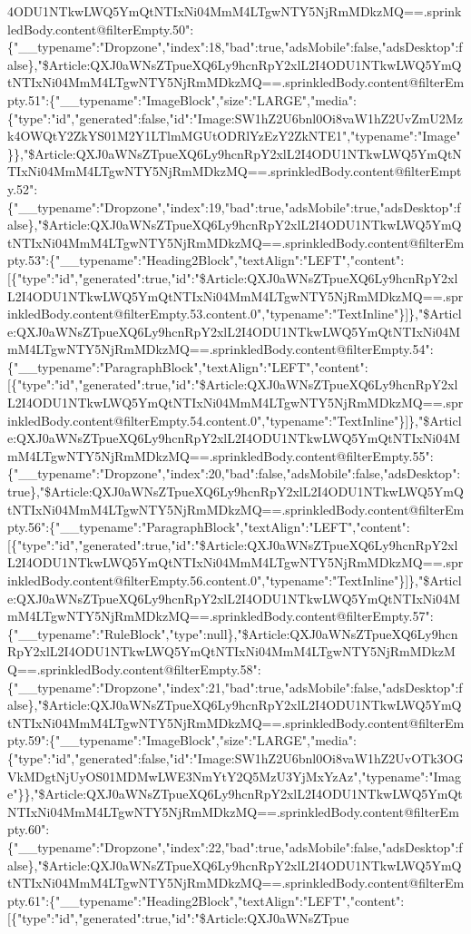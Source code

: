 4ODU1NTkwLWQ5YmQtNTIxNi04MmM4LTgwNTY5NjRmMDkzMQ==.sprinkledBody.content@filterEmpty.50":\{"\_\_typename":"Dropzone","index":18,"bad":true,"adsMobile":false,"adsDesktop":false\},"\$Article:QXJ0aWNsZTpueXQ6Ly9hcnRpY2xlL2I4ODU1NTkwLWQ5YmQtNTIxNi04MmM4LTgwNTY5NjRmMDkzMQ==.sprinkledBody.content@filterEmpty.51":\{"\_\_typename":"ImageBlock","size":"LARGE","media":\{"type":"id","generated":false,"id":"Image:SW1hZ2U6bnl0Oi8vaW1hZ2UvZmU2Mzk4OWQtY2ZkYS01M2Y1LTlmMGUtODRlYzEzY2ZkNTE1","typename":"Image"\}\},"\$Article:QXJ0aWNsZTpueXQ6Ly9hcnRpY2xlL2I4ODU1NTkwLWQ5YmQtNTIxNi04MmM4LTgwNTY5NjRmMDkzMQ==.sprinkledBody.content@filterEmpty.52":\{"\_\_typename":"Dropzone","index":19,"bad":true,"adsMobile":true,"adsDesktop":false\},"\$Article:QXJ0aWNsZTpueXQ6Ly9hcnRpY2xlL2I4ODU1NTkwLWQ5YmQtNTIxNi04MmM4LTgwNTY5NjRmMDkzMQ==.sprinkledBody.content@filterEmpty.53":\{"\_\_typename":"Heading2Block","textAlign":"LEFT","content":{[}\{"type":"id","generated":true,"id":"\$Article:QXJ0aWNsZTpueXQ6Ly9hcnRpY2xlL2I4ODU1NTkwLWQ5YmQtNTIxNi04MmM4LTgwNTY5NjRmMDkzMQ==.sprinkledBody.content@filterEmpty.53.content.0","typename":"TextInline"\}{]}\},"\$Article:QXJ0aWNsZTpueXQ6Ly9hcnRpY2xlL2I4ODU1NTkwLWQ5YmQtNTIxNi04MmM4LTgwNTY5NjRmMDkzMQ==.sprinkledBody.content@filterEmpty.54":\{"\_\_typename":"ParagraphBlock","textAlign":"LEFT","content":{[}\{"type":"id","generated":true,"id":"\$Article:QXJ0aWNsZTpueXQ6Ly9hcnRpY2xlL2I4ODU1NTkwLWQ5YmQtNTIxNi04MmM4LTgwNTY5NjRmMDkzMQ==.sprinkledBody.content@filterEmpty.54.content.0","typename":"TextInline"\}{]}\},"\$Article:QXJ0aWNsZTpueXQ6Ly9hcnRpY2xlL2I4ODU1NTkwLWQ5YmQtNTIxNi04MmM4LTgwNTY5NjRmMDkzMQ==.sprinkledBody.content@filterEmpty.55":\{"\_\_typename":"Dropzone","index":20,"bad":false,"adsMobile":false,"adsDesktop":true\},"\$Article:QXJ0aWNsZTpueXQ6Ly9hcnRpY2xlL2I4ODU1NTkwLWQ5YmQtNTIxNi04MmM4LTgwNTY5NjRmMDkzMQ==.sprinkledBody.content@filterEmpty.56":\{"\_\_typename":"ParagraphBlock","textAlign":"LEFT","content":{[}\{"type":"id","generated":true,"id":"\$Article:QXJ0aWNsZTpueXQ6Ly9hcnRpY2xlL2I4ODU1NTkwLWQ5YmQtNTIxNi04MmM4LTgwNTY5NjRmMDkzMQ==.sprinkledBody.content@filterEmpty.56.content.0","typename":"TextInline"\}{]}\},"\$Article:QXJ0aWNsZTpueXQ6Ly9hcnRpY2xlL2I4ODU1NTkwLWQ5YmQtNTIxNi04MmM4LTgwNTY5NjRmMDkzMQ==.sprinkledBody.content@filterEmpty.57":\{"\_\_typename":"RuleBlock","type":null\},"\$Article:QXJ0aWNsZTpueXQ6Ly9hcnRpY2xlL2I4ODU1NTkwLWQ5YmQtNTIxNi04MmM4LTgwNTY5NjRmMDkzMQ==.sprinkledBody.content@filterEmpty.58":\{"\_\_typename":"Dropzone","index":21,"bad":true,"adsMobile":false,"adsDesktop":false\},"\$Article:QXJ0aWNsZTpueXQ6Ly9hcnRpY2xlL2I4ODU1NTkwLWQ5YmQtNTIxNi04MmM4LTgwNTY5NjRmMDkzMQ==.sprinkledBody.content@filterEmpty.59":\{"\_\_typename":"ImageBlock","size":"LARGE","media":\{"type":"id","generated":false,"id":"Image:SW1hZ2U6bnl0Oi8vaW1hZ2UvOTk3OGVkMDgtNjUyOS01MDMwLWE3NmYtY2Q5MzU3YjMxYzAz","typename":"Image"\}\},"\$Article:QXJ0aWNsZTpueXQ6Ly9hcnRpY2xlL2I4ODU1NTkwLWQ5YmQtNTIxNi04MmM4LTgwNTY5NjRmMDkzMQ==.sprinkledBody.content@filterEmpty.60":\{"\_\_typename":"Dropzone","index":22,"bad":true,"adsMobile":false,"adsDesktop":false\},"\$Article:QXJ0aWNsZTpueXQ6Ly9hcnRpY2xlL2I4ODU1NTkwLWQ5YmQtNTIxNi04MmM4LTgwNTY5NjRmMDkzMQ==.sprinkledBody.content@filterEmpty.61":\{"\_\_typename":"Heading2Block","textAlign":"LEFT","content":{[}\{"type":"id","generated":true,"id":"\$Article:QXJ0aWNsZTpue